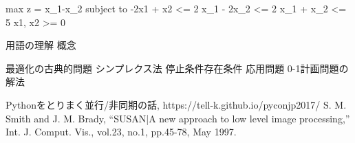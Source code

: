 \documentclass[14pt, oneside]{article}     	%
\begin{document}
max z = x_1-x_2
subject to
-2x1 + x2 <= 2
x_1 - 2x_2 <= 2
x_1 + x_2 <= 5
x1, x2 >= 0

用語の理解
概念

最適化の古典的問題
シンプレクス法
停止条件存在条件
応用問題
0-1計画問題の解法

\begin{thebibliography}{9}
   Pythonをとりまく並行/非同期の話,  https://tell-k.github.io/pyconjp2017/
   S. M. Smith and J. M. Brady,
    ``SUSAN|A new approach to low level image processing,'' Int. J. Comput.
    Vis., vol.23, no.1, pp.45-78, May 1997.
\end{thebibliography}
\end{document}
